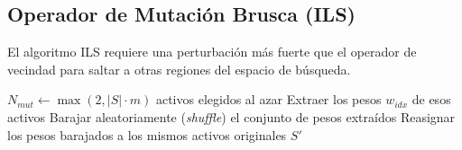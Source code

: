 \subsection{Operador de Mutación Brusca (ILS)}

El algoritmo ILS requiere una perturbación más fuerte que el operador de vecindad para saltar a otras regiones del espacio de búsqueda.

\begin{algorithm}[H]
\SetAlgoLined
{}

$N_{mut} \leftarrow \max(2, |S| \cdot m)$ activos elegidos al azar\;
Extraer los pesos $w_{idx}$ de esos activos\;
Barajar aleatoriamente (\textit{shuffle}) el conjunto de pesos extraídos\;
Reasignar los pesos barajados a los mismos activos originales\;
\Return $S'$\;
\caption{Mutación por barajado (ILS)}
\end{algorithm}